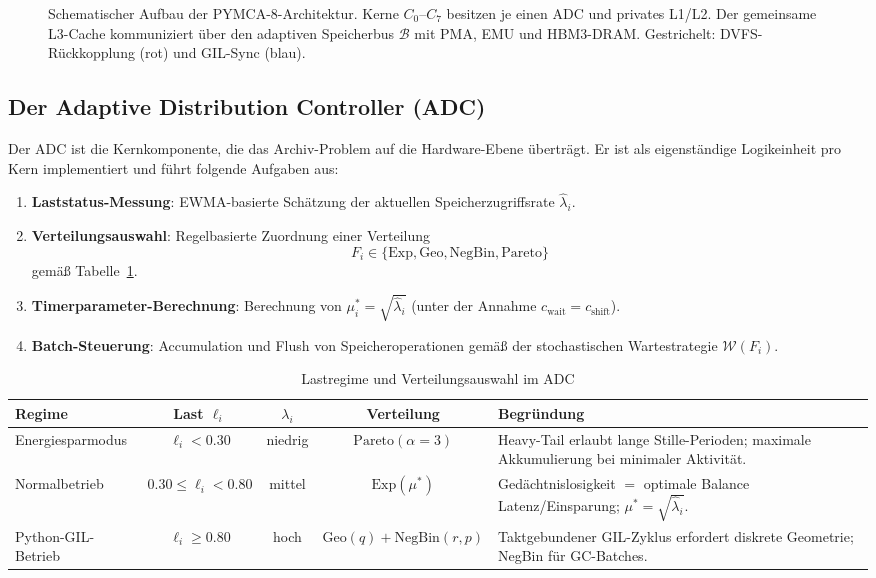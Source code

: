 ﻿\documentclass[a4paper,12pt]{scrreprt}
\theoremstyle{definition}
\newcommand{\Exp}{\mathrm{Exp}}
\newcommand{\Geo}{\mathrm{Geo}}
\newcommand{\NBin}{\mathrm{NegBin}}
\newcommand{\Pareto}{\mathrm{Pareto}}
\begin{document}
\begin{figure}[h!]
\begin{tikzpicture}
		\end{tikzpicture}
		\caption{Schematischer Aufbau der PYMCA-8-Architektur. Kerne $C_0$--$C_7$
			besitzen je einen ADC und privates L1/L2. Der gemeinsame L3-Cache
			kommuniziert über den adaptiven Speicherbus $\mathcal{B}$ mit PMA, EMU
			und HBM3-DRAM. Gestrichelt: DVFS-Rückkopplung (rot) und GIL-Sync (blau).}
		\label{fig:arch_tikz}
	\end{figure}
	
	\subsection{Der Adaptive Distribution Controller (ADC)}
	
	Der ADC ist die Kernkomponente, die das Archiv-Problem auf die
	Hardware-Ebene überträgt. Er ist als eigenständige Logikeinheit
	pro Kern implementiert und führt folgende Aufgaben aus:
	
	\begin{enumerate}[label=\arabic*.,noitemsep]
		\item \textbf{Laststatus-Messung}: EWMA-basierte Schätzung der aktuellen
		Speicherzugriffsrate $\hat\lambda_i$.
		\item \textbf{Verteilungsauswahl}: Regelbasierte Zuordnung einer Verteilung
		$$F_i \in \{\Exp, \Geo, \NBin, \Pareto\}$$ gemäß Tabelle~\ref{tab:regime}.
		\item \textbf{Timerparameter-Berechnung}: Berechnung von $\mu_i^* = \sqrt{\hat\lambda_i}$
		(unter der Annahme $c_{\mathrm{wait}} = c_{\mathrm{shift}}$).
		\item \textbf{Batch-Steuerung}: Accumulation und Flush von Speicheroperationen
		gemäß der stochastischen Wartestrategie $\mathcal{W}(F_i)$.
	\end{enumerate}
	
	\begin{table}
		\centering
		\caption{Lastregime und Verteilungsauswahl im ADC}
		\label{tab:regime}
		\renewcommand{\arraystretch}{1.3}
		\begin{tabular}{lcccp{4.5cm}}
			\toprule
			\textbf{Regime} & \textbf{Last $\ell_i$} & \textbf{$\lambda_i$} &
			\textbf{Verteilung} & \textbf{Begründung} \\
			\midrule
			Energiesparmodus & $\ell_i < 0.30$ & niedrig &
			$\Pareto(\alpha=3)$ & Heavy-Tail erlaubt lange Stille-Perioden;
			maximale Akkumulierung bei minimaler Aktivität. \\
			Normalbetrieb & $0.30 \le \ell_i < 0.80$ & mittel &
			$\Exp(\mu^*)$ & Gedächtnislosigkeit $=$ optimale Balance
			Latenz/Einsparung; $\mu^* = \sqrt{\hat\lambda_i}$. \\
			Python-GIL-Betrieb & $\ell_i \ge 0.80$ & hoch &
			$\Geo(q) + \NBin(r,p)$ & Taktgebundener GIL-Zyklus erfordert
			diskrete Geometrie; NegBin für GC-Batches. \\
			\bottomrule
		\end{tabular}
	\end{table}
	
\end{document}
